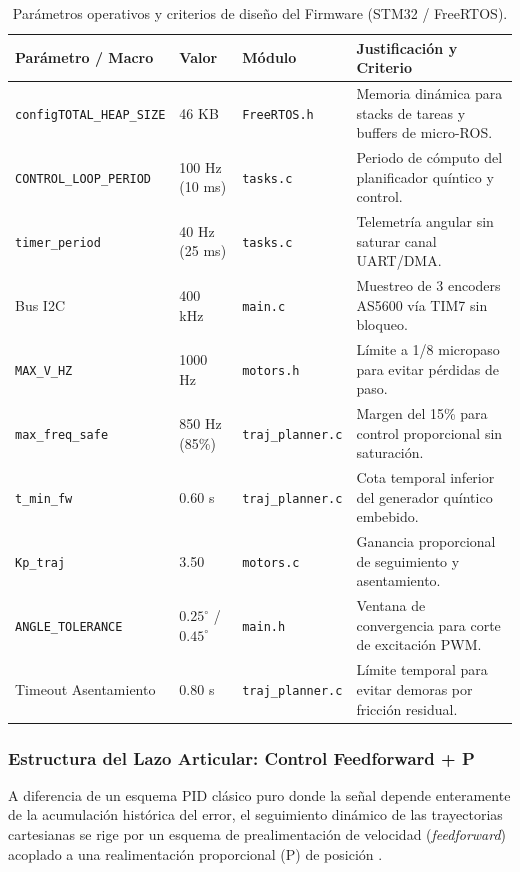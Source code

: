 \documentclass[12pt, a4paper]{report}
\begin{document}
\begin{table}[H]
\centering
\small
\begin{tabularx}{\linewidth}{|p{3.0cm}|p{2.1cm}|p{2.5cm}|X|}
\hline
\textbf{Parámetro / Macro} & \textbf{Valor} & \textbf{Módulo} & \textbf{Justificación y Criterio} \\
\hline
\texttt{configTOTAL\_}\linebreak\texttt{HEAP\_SIZE} & 46 KB & \texttt{FreeRTOS.h} & Memoria dinámica para stacks de tareas y buffers de micro-ROS. \\
\hline
\texttt{CONTROL\_LOOP\_}\linebreak\texttt{PERIOD} & 100 Hz (10 ms) & \texttt{tasks.c} & Periodo de cómputo del planificador quíntico y control. \\
\hline
\texttt{timer\_period} & 40 Hz (25 ms) & \texttt{tasks.c} & Telemetría angular sin saturar canal UART/DMA. \\
\hline
Bus I2C & 400 kHz & \texttt{main.c} & Muestreo de 3 encoders AS5600 vía TIM7 sin bloqueo. \\
\hline
\texttt{MAX\_V\_HZ} & 1000 Hz & \texttt{motors.h} & Límite a 1/8 micropaso para evitar pérdidas de paso. \\
\hline
\texttt{max\_freq\_safe} & 850 Hz (85\%) & \texttt{traj\_planner.c} & Margen del 15\% para control proporcional sin saturación. \\
\hline
\texttt{t\_min\_fw} & 0.60 s & \texttt{traj\_planner.c} & Cota temporal inferior del generador quíntico embebido. \\
\hline
\texttt{Kp\_traj} & 3.50 & \texttt{motors.c} & Ganancia proporcional de seguimiento y asentamiento. \\
\hline
\texttt{ANGLE\_}\linebreak\texttt{TOLERANCE} & $0.25^\circ$ / $0.45^\circ$ & \texttt{main.h} & Ventana de convergencia para corte de excitación PWM. \\
\hline
Timeout Asentamiento & 0.80 s & \texttt{traj\_planner.c} & Límite temporal para evitar demoras por fricción residual. \\
\hline
\end{tabularx}
\caption{Parámetros operativos y criterios de diseño del Firmware (STM32 / FreeRTOS).}
\label{tab:parametros_firmware}
\end{table}

\subsubsection{Estructura del Lazo Articular: Control Feedforward + P}
A diferencia de un esquema PID clásico puro donde la señal depende enteramente de la acumulación histórica del error, el seguimiento dinámico de las trayectorias cartesianas se rige por un esquema de prealimentación de velocidad (\textit{feedforward}) acoplado a una realimentación proporcional (P) de posición \cite{bib:craig}.
\end{document}
